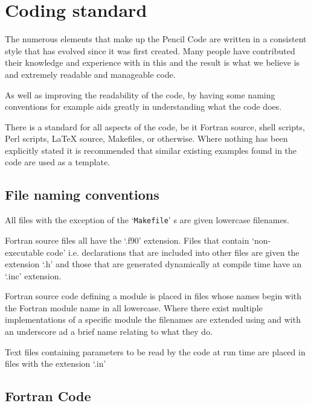 \documentclass[\mydriver,12pt,twoside,notitlepage,a4paper]{article}
\makeatletter
\newcommand{\file}[2][]{%
  \def\index@{#1}%
  `\texttt{#2}'%
  \ifx\index@\@empty\index[file]{#2@\texttt{#2}}%
  \else\index[file]{#1@\texttt{#1}}%
  \fi%
}
\makeatother
\begin{document}
\section{Coding standard}
\label{coding-standard}

The numerous elements that make up the {\sc Pencil Code} are written
in a consistent style that has evolved since it was first created.
Many people have contributed their knowledge and experience with
in this and the result is what we believe is and extremely
readable and manageable code.

As well as improving the readability of the code, by having some
naming conventions for example aids greatly in understanding what
the code does.

There is a standard for all aspects of the code, be it Fortran source,
shell scripts, Perl scripts, LaTeX source, Makefiles, or otherwise.
Where nothing has been explicitly stated it is recommended that
similar existing examples found in the code are used as a template.

\subsection{File naming conventions}
All files with the exception of the \file{Makefile}s are given
lowercase filenames.

Fortran source files all have the `.f90' extension.  Files that
contain `non-executable code' i.e. declarations that are included into
other files are given the extension `.h' and those that are generated
dynamically at compile time have an `.inc' extension.

Fortran source code defining a module is placed in files whose names
begin with the Fortran module name in all lowercase.  Where there
exist multiple implementations of a specific module the filenames
are extended using and with an underscore ad a brief name relating
to what they do.

Text files containing parameters to be read by the code at run time are
placed in files with the extension `.in'


\subsection{Fortran Code}
\label{CodingStandards}
\end{document}
